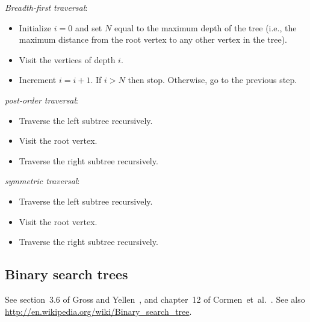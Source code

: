 \noindent
{\it Breadth-first traversal}:
\begin{itemize}
\item
Initialize $i=0$ and set $N$ equal to the maximum depth
of the tree (i.e., the maximum distance from the root vertex
to any other vertex in the tree).

\item
Visit the vertices of depth $i$.

\item
Increment $i=i+1$. If $i>N$ then stop. Otherwise, go to
the previous step.

\end{itemize}


\noindent
{\it post-order traversal}:
\begin{itemize}
\item
Traverse the left subtree recursively.

\item
Visit the root vertex.

\item
Traverse the right subtree recursively.

\end{itemize}


\noindent
{\it symmetric traversal}:
\begin{itemize}
\item
Traverse the left subtree recursively.

\item
Visit the root vertex.

\item
Traverse the right subtree recursively.

\end{itemize}


\subsection{Binary search trees}

See section~3.6 of Gross and Yellen~\cite{GrossYellen1999}, and
chapter~12 of Cormen~et~al.~\cite{CormenEtAl2001}. See also
\url{http://en.wikipedia.org/wiki/Binary_search_tree}.


